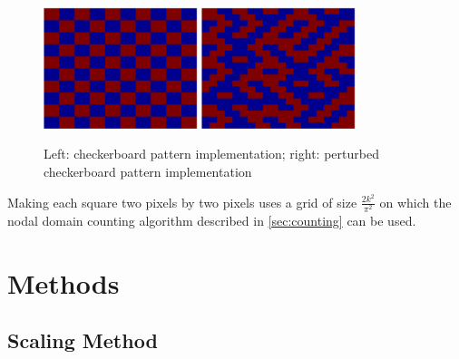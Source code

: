 \documentclass{report}
\begin{document}
\begin{figure}
  \begin{center}
    \includegraphics[width=0.4\textwidth]{figs/percolation/checkerboard_implementation.eps}
    \hspace{1 cm}
    \includegraphics[width=0.4\textwidth]{figs/percolation/perturbed_implementation.eps}
    \caption{Left: checkerboard pattern implementation; right: perturbed checkerboard pattern implementation}
    \label{fig:percolation_implementation}
  \end{center}
\end{figure}

Making each square two pixels by two pixels uses a grid of size $\frac{2 k^{2}}{\pi^2}$ on which the nodal domain counting algorithm described in \ref{sec:counting} can be used.

\chapter{Methods}
\section{Scaling Method}
\label{sec:scaling_method}
\end{document}
